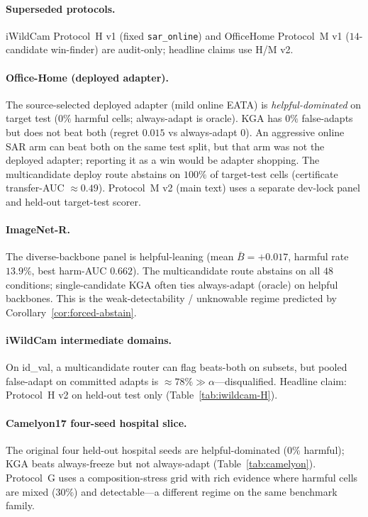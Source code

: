 \paragraph{Superseded protocols.}
iWildCam Protocol~H v1 (fixed \texttt{sar\_online}) and OfficeHome Protocol~M v1
($14$-candidate win-finder) are audit-only; headline claims use H/M v2.

\paragraph{Office-Home (deployed adapter).}
The source-selected deployed adapter (mild online EATA) is \emph{helpful-dominated} on target
test ($0\%$ harmful cells; always-adapt is oracle). \textsc{KGA} has $0\%$ false-adapts but
does not beat both (regret $0.015$ vs always-adapt $0$). An aggressive online SAR arm can beat
both on the same test split, but that arm was not the deployed adapter; reporting it as a win
would be adapter shopping. The multicandidate deploy route abstains on $100\%$ of target-test
cells (certificate transfer-AUC $\approx 0.49$). Protocol~M v2 (main text) uses a separate
dev-lock panel and held-out target-test scorer.

\paragraph{ImageNet-R.}
The diverse-backbone panel is helpful-leaning (mean $\bar B{=}{+}0.017$, harmful rate
$13.9\%$, best harm-AUC $0.662$). The multicandidate route abstains on all $48$ conditions;
single-candidate \textsc{KGA} often ties always-adapt (oracle) on helpful backbones. This is
the weak-detectability / unknowable regime predicted by Corollary~\ref{cor:forced-abstain}.

\paragraph{iWildCam intermediate domains.}
On id\_val, a multicandidate router can flag beats-both on subsets, but pooled false-adapt
on committed adapts is $\approx 78\%\gg\alpha$---disqualified. Headline claim: Protocol~H v2 on
held-out test only (Table~\ref{tab:iwildcam-H}).

\paragraph{Camelyon17 four-seed hospital slice.}
The original four held-out hospital seeds are helpful-dominated ($0\%$ harmful); \textsc{KGA}
beats always-freeze but not always-adapt (Table~\ref{tab:camelyon}). Protocol~G uses a
composition-stress grid with rich evidence where harmful cells are mixed ($30\%$) and
detectable---a different regime on the same benchmark family.

